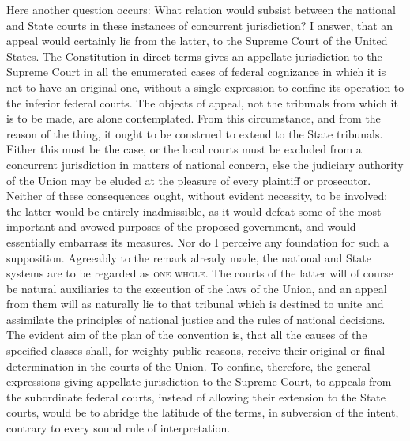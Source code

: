 Here another question occurs: What relation would subsist between the national and State courts in these instances of concurrent jurisdiction? 
I answer, that an appeal would certainly lie from the latter, to the Supreme Court of the United States. 
The Constitution in direct terms gives an appellate jurisdiction to the Supreme Court in all the enumerated cases of federal cognizance in which it is not to have an original one, without a single expression to confine its operation to the inferior federal courts. 
The objects of appeal, not the tribunals from which it is to be made, are alone contemplated. 
From this circumstance, and from the reason of the thing, it ought to be construed to extend to the State tribunals. 
Either this must be the case, or the local courts must be excluded from a concurrent jurisdiction in matters of national concern, else the judiciary authority of the Union may be eluded at the pleasure of every plaintiff or prosecutor. 
Neither of these consequences ought, without evident necessity, to be involved; the latter would be entirely inadmissible, as it would defeat some of the most important and avowed purposes of the proposed government, and would essentially embarrass its measures. 
Nor do I perceive any foundation for such a supposition. 
Agreeably to the remark already made, the national and State systems are to be regarded as \textsc{one whole}. 
The courts of the latter will of course be natural auxiliaries to the execution of the laws of the Union, and an appeal from them will as naturally lie to that tribunal which is destined to unite and assimilate the principles of national justice and the rules of national decisions. 
The evident aim of the plan of the convention is, that all the causes of the specified classes shall, for weighty public reasons, receive their original or final determination in the courts of the Union. 
To confine, therefore, the general expressions giving appellate jurisdiction to the Supreme Court, to appeals from the subordinate federal courts, instead of allowing their extension to the State courts, would be to abridge the latitude of the terms, in subversion of the intent, contrary to every sound rule of interpretation.

